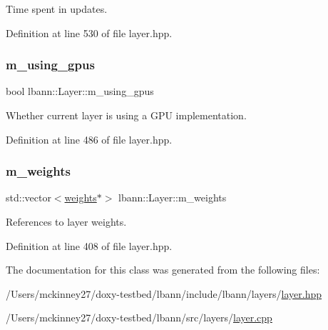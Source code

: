 Time spent in updates. 

Definition at line 530 of file layer.\+hpp.

\mbox{\label{classlbann_1_1Layer_af7881cb5eff5207c15fa835d65462e8f}} 
\subsubsection{\texorpdfstring{m\+\_\+using\+\_\+gpus}{m\_using\_gpus}}
{\footnotesize\ttfamily bool lbann\+::\+Layer\+::m\+\_\+using\+\_\+gpus\hspace{0.3cm}{\ttfamily [protected]}}

Whether current layer is using a G\+PU implementation. 

Definition at line 486 of file layer.\+hpp.

\mbox{\label{classlbann_1_1Layer_a7954e30fbf9100a6ba4b56d02767a469}} 
\subsubsection{\texorpdfstring{m\+\_\+weights}{m\_weights}}
{\footnotesize\ttfamily std\+::vector$<$\hyperlink{classlbann_1_1weights}{weights}$\ast$$>$ lbann\+::\+Layer\+::m\+\_\+weights\hspace{0.3cm}{\ttfamily [protected]}}

References to layer weights. 

Definition at line 408 of file layer.\+hpp.



The documentation for this class was generated from the following files\+:\begin{DoxyCompactItemize}
\item 
/\+Users/mckinney27/doxy-\/testbed/lbann/include/lbann/layers/\hyperlink{layer_8hpp}{layer.\+hpp}\item 
/\+Users/mckinney27/doxy-\/testbed/lbann/src/layers/\hyperlink{layer_8cpp}{layer.\+cpp}\end{DoxyCompactItemize}
